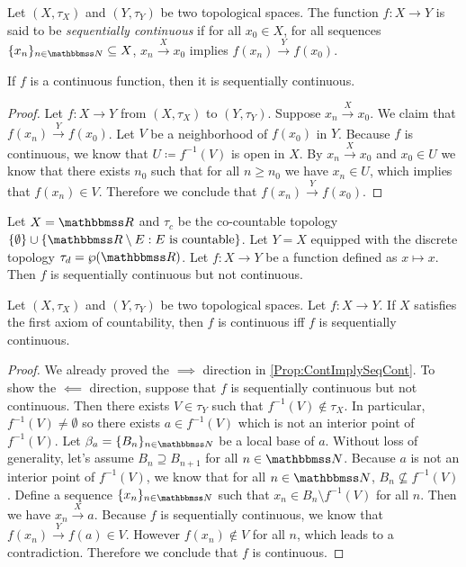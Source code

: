 \documentclass[screen,single]{techreport}
\numberwithin{equation}{section}
\begin{document}
\begin{definition}\label{De:SequentiallyContinuous}
	Let $(X,\tau_X)$ and $(Y,\tau_Y)$ be two topological spaces.
	The function $f : X \to Y$ is said to be \emph{sequentially continuous} if for all $x_0 \in X$, for all sequences $\{x_n\}_{n \in \bbN} \subseteq X$, $x_n \xrightarrow{X} x_0$ implies $f(x_n) \xrightarrow{Y} f(x_0)$.
\end{definition}

\begin{proposition}\label{Prop:ContImplySeqCont}
	If $f$ is a continuous function, then it is sequentially continuous.
\end{proposition}
\begin{proof}
	Let $f : X \to Y$ from $(X,\tau_X)$ to $(Y,\tau_Y)$.
	Suppose $x_n \xrightarrow{X} x_0$.
	We claim that $f(x_n) \xrightarrow{Y} f(x_0)$.
	Let $V$ be a neighborhood of $f(x_0)$ in $Y$.
	Because $f$ is continuous, we know that $U \coloneqq f^{-1}(V)$ is open in $X$.
	By $x_n \xrightarrow{X} x_0$ and $x_0 \in U$ we know that there exists $n_0$ such that for all $n \ge n_0$ we have $x_n \in U$, which implies that $f(x_n) \in V$.
	Therefore we conclude that $f(x_n) \xrightarrow{Y} f(x_0)$.
\end{proof}

\begin{example}\label{Exa:SeqContNotCont}
	Let $X = \bbR$ and $\tau_c$ be the co-countable topology $\{ \emptyset \} \cup \{ \bbR \setminus E : E~\text{is countable} \}$.
	Let $Y = X$ equipped with the discrete topology $\tau_d = \wp(\bbR)$.
	Let $f : X \to Y$ be a function defined as $x \mapsto x$.
	Then $f$ is sequentially continuous but not continuous.
\end{example}

\begin{proposition}\label{Prop:FstAxCountContIffSeqCont}
	Let $(X,\tau_X)$ and $(Y,\tau_Y)$ be two topological spaces.
	Let $f : X\to Y$.
	If $X$ satisfies the first axiom of countability, then $f$ is continuous iff $f$ is sequentially continuous.
\end{proposition}
\begin{proof}
	We already proved the ${\implies}$ direction in \cref{Prop:ContImplySeqCont}.
	To show the ${\impliedby}$ direction, suppose that $f$ is sequentially continuous but not continuous.
	Then there exists $V \in \tau_Y$ such that $f^{-1}(V) \not\in \tau_X$.
	In particular, $f^{-1}(V) \neq \emptyset$ so there exists $a \in f^{-1}(V)$ which is not an interior point of $f^{-1}(V)$.
	Let $\beta_a = \{B_n\}_{n\in \bbN}$ be a local base of $a$.
	Without loss of generality, let's assume $B_n \supseteq B_{n+1}$ for all $n \in \bbN$.
	Because $a$ is not an interior point of $f^{-1}(V)$, we know that for all $n \in \bbN$, $B_n \not\subseteq f^{-1}(V)$.
	Define a sequence $\{x_n\}_{n \in \bbN}$ such that $x_n \in B_n \setminus f^{-1}(V)$ for all $n$.
	Then we have $x_n \xrightarrow{X} a$.
	Because $f$ is sequentially continuous, we know that $f(x_n) \xrightarrow{Y} f(a) \in V$.
	However $f(x_n) \not\in V$ for all $n$, which leads to a contradiction.
	Therefore we conclude that $f$ is continuous.
\end{proof}
\end{document}
